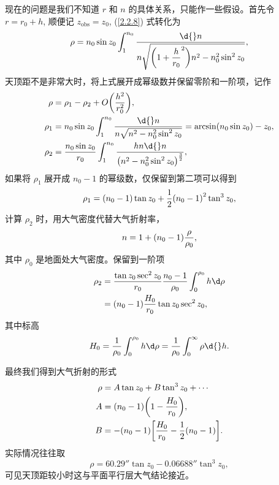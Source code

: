 \documentclass[UTF8, 12pt, a4paper, oneside, onecolumn, fontset=none]{ctexart}
\begin{document}
现在的问题是我们不知道 $r$ 和 $n$ 的具体关系，只能作一些假设。首先令 $r=r_{0}+h$, 顺便记 $z_{\mathrm{obs}}=z_{0}$, (\ref{2.2.8}) 式转化为
\begin{equation}
\rho=n_{0}\sin{z_{0}}\int_{1}^{n_{0}}\frac{\d{}n}{n\sqrt{\mleft(1+\dfrac{h}{r_{0}}^{2}\mright) n^{2}-n_{0}^{2}\sin^{2}{z_{0}}}},
\end{equation}
天顶距不是非常大时，将上式展开成幂级数并保留零阶和一阶项，记作
\begin{align}
\rho&=\rho_{1}-\rho_{2}+O\mleft(\frac{h^{2}}{r_{0}^{2}}\mright),\\
\rho_{1}&=n_{0}\sin{z_{0}}\int_{1}^{n_{0}}\frac{\d{}n}{n\sqrt{n^{2}-n_{0}^{2}\sin^{2}{z_{0}}}}=\arcsin\mleft(n_{0}\sin{z_{0}}\mright)-z_{0},\\
\rho_{2}&=\frac{n_{0}\sin{z_{0}}}{r_{0}}\int_{1}^{n_{0}}\frac{hn\d{}n}{\mleft(n^{2}-n_{0}^{2}\sin^{2}{z_{0}}\mright)^{\frac{3}{2}}},
\end{align}
如果将 $\rho_{1}$ 展开成 $n_{0}-1$ 的幂级数，仅保留到第二项可以得到
\begin{equation}
\rho_{1}=\mleft(n_{0}-1\mright)\tan{z_{0}}+\frac{1}{2}\mleft(n_{0}-1\mright)^{2}\tan^{3}{z_{0}},
\end{equation}
计算 $\rho_{2}$ 时，用大气密度代替大气折射率，
\begin{equation}
n=1+\mleft(n_{0}-1\mright)\frac{\rho}{\rho_{0}},
\end{equation}
其中 $\rho_{0}$ 是地面处大气密度。保留到一阶项
\begin{align}
\rho_{2}&=\frac{\tan{z_{0}}\sec^{2}{z_{0}}}{r_{0}}\frac{n_{0}-1}{\rho_{0}}\int_{0}^{\rho_{0}}h\d\rho\notag\\
&=\mleft(n_{0}-1\mright)\frac{H_{0}}{r_{0}}\tan{z_{0}}\sec^{2}{z_{0}},
\end{align}
其中标高
\begin{equation}
H_{0}=\frac{1}{\rho_{0}}\int_{0}^{\rho_{0}}h\d\rho=\frac{1}{\rho_{0}}\int_{0}^{\infty}\rho\d{}h.
\end{equation}

最终我们得到大气折射的形式
\begin{align}
\rho&=A\tan{z_{0}}+B\tan^{3}{z_{0}}+\cdots\\
A&=\mleft(n_{0}-1\mright)\mleft(1-\frac{H_{0}}{r_{0}}\mright),\\
B&=-\mleft(n_{0}-1\mright)\mleft[\frac{H_{0}}{r_{0}}-\frac{1}{2}\mleft(n_{0}-1\mright)\mright].
\end{align}
实际情况往往取
\begin{equation}
\rho=\ang{;; 60.29}\tan{z_{0}}-\ang{;; 0.06688}\tan^{3}{z_{0}},
\end{equation}
可见天顶距较小时这与平面平行层大气结论接近。
\end{document}
